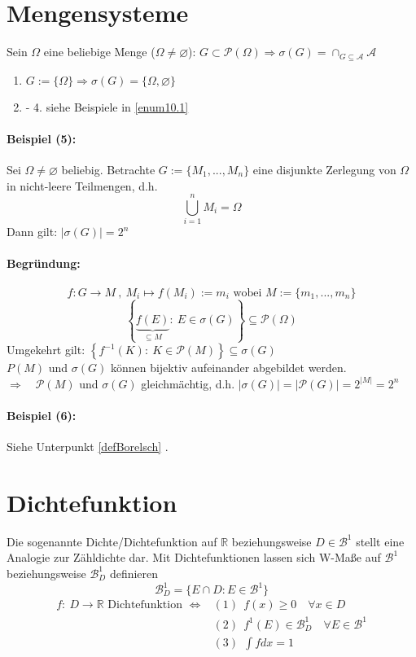 \documentclass[12pt,a4paper]{article}
\begin{document}
	\section*{Mengensysteme}
	Sein $\Omega$ eine beliebige Menge ($\Omega \neq \varnothing$): $\displaystyle G\subset \mathcal{P}(\Omega) \Rightarrow \sigma(G) = \cap_{G\subseteq \mathcal{A}} \mathcal{A}$
	\begin{enumerate}
		\item $\displaystyle G:=\{ \Omega \} \Rightarrow \sigma(G)=\{\Omega ,\varnothing\}$
		\item - 4. siehe Beispiele in \ref{enum10.1} 
	\end{enumerate}
	\paragraph{Beispiel (5):}
	Sei $\Omega\neq\varnothing$ beliebig. Betrachte $G:=\{ M_1 , ..., M_n\}$ eine disjunkte Zerlegung von $\Omega$ in nicht-leere Teilmengen, d.h.
	$$\bigcup_{i=1}^n M_i = \Omega$$
	Dann gilt: $\displaystyle \left| \sigma(G)\right| = 2^n$
	\paragraph{Begründung:}
	$$f:G \rightarrow M \: , \: M_i \longmapsto f(M_i):=m_i \text{ wobei } M:=\{m_1,...,m_n\}$$
	$$\left\{\underbrace{f(E)}_{\subseteq M} : \: E\in\sigma (G)\right\} \subseteq \mathcal P(\Omega)$$	
	Umgekehrt gilt: $\displaystyle \left\{f^{-1}(K): \: K\in\mathcal{P}(M)\right\}\subseteq \sigma(G)$ \\
	$P(M)$ und $\sigma(G)$ können bijektiv aufeinander abgebildet werden. \\
	$\Rightarrow \quad \mathcal{P}(M)$ und $\sigma (G)$ gleichmächtig, d.h. $|\sigma (G)|=|\mathcal{P}(G)|=2^{|M|}=2^n$
	\paragraph{Beispiel (6):}	
	Siehe Unterpunkt \ref{defBorelsch} .
	
	\section*{Dichtefunktion}
	Die sogenannte Dichte/Dichtefunktion auf $\mathbb{R}$ beziehungsweise $D\in\mathcal{B}^1$ stellt eine Analogie zur Zähldichte dar. Mit Dichtefunktionen lassen sich W-Maße auf $\mathcal{B}^1$ beziehungsweise $\mathcal{B}^1_D$ definieren
	$$\mathcal{B}^1_D = \{E\cap D : E\in\mathcal{B}^1\}$$
	$$$$
	\begin{align*}
	f:\: D\rightarrow\mathbb{R} \text{ Dichtefunktion }  \Leftrightarrow & (1)\:\: f(x)\geq 0 \quad \forall x\in D\\
	& (2)\:\: f^1(E)\in\mathcal{B}^1_D \quad \forall E\in\mathcal{B}^1\\
	& (3)\:\: \int fdx = 1
	\end{align*}
	
\end{document}
